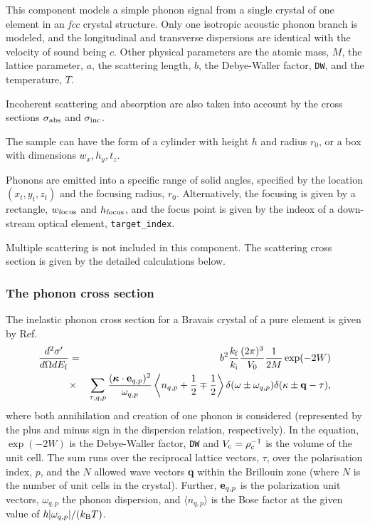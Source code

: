 This component models a simple phonon signal from a single crystal of 
one element in an {\em fcc} crystal structure.
Only one isotropic acoustic phonon branch is modeled, and the longitudinal
and transverse dispersions are identical with the velocity of sound being $c$.
Other physical parameters are the atomic mass, $M$, the lattice parameter, $a$,
the scattering length, $b$,
the Debye-Waller factor, \verb+DW+, and the temperature, $T$.

Incoherent scattering and absorption are also taken into account by the cross
sections $\sigma_{\rm abs}$ and $\sigma_{\rm inc}$.

The sample can have the form of a cylinder with height $h$ and radius
$r_0$, or a box with dimensions $w_x, h_y, t_z$. 

Phonons are emitted into a specific range of solid angles, specified 
by the location $(x_t, y_t, z_t)$ and the focusing radius, $r_0$.
Alternatively, the focusing is given by a rectangle, 
$w_{\rm focus}$ and $h_{\rm focus}$, and the focus point is given by the
indeox of a down-stream optical element, \verb+target_index+.

Multiple scattering is not included in this component. The scattering
cross section is given by the detailed calculations below.

\subsubsection{The phonon cross section} %
The inelastic phonon cross section for a Bravais crystal of a pure element
is given by Ref.~\cite[ch.3~]{squires} 
\begin{eqnarray}
\frac{d^2\sigma'}{d\Omega dE_{\rm f}} &=&
  b^2 \frac{k_{\rm f}}{k_{\rm i}} \frac{(2\pi)^3}{V_0}\frac{1}{2M} \exp(-2W) \nonumber \\
&\times&
  \sum_{\tau,q,p} \frac{(\mbox{\boldmath $\kappa$} \cdot {\bf e}_{q,p})^2}
                       {\omega_{q,p}} 
  \left\langle n_{q,p} + \frac{1}{2} \mp \frac{1}{2} \right\rangle
  \delta(\omega\pm\omega_{q,p}) \delta(\kappa\pm{\bf q}-\tau) ,
\end{eqnarray}
where both annihilation and creation of one phonon is considered
(represented by the plus and minus sign in the dispersion relation,
respectively).
In the equation, 
$\exp(-2W)$ is the Debye-Waller factor, \verb+DW+ and
$V_{\rm c} = \rho_{\rm c}^{-1}$ is the volume of the unit cell.
The sum runs over the reciprocal lattice vectors, $\tau$, 
over the polarisation index, $p$,
and the $N$ allowed wave vectors {\bf q} within the Brillouin zone
(where $N$ is the number of unit cells in the crystal).
Further, ${\bf e}_{q,p}$ is the
polarization unit vectors, $\omega_{q,p}$ the phonon dispersion,
and $\langle n_{q,p} \rangle$ is the Bose factor at the given value of
$\hbar |\omega_{q,p}|/(k_{\rm B}T)$.

